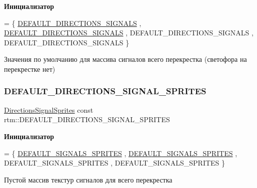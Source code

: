 {\bfseries Инициализатор}
\begin{DoxyCode}
= \{
        \hyperlink{namespacertm_ab5bb2d119539a5a60349a21fec8821f6}{DEFAULT\_DIRECTIONS\_SIGNALS}
        , \hyperlink{namespacertm_ab5bb2d119539a5a60349a21fec8821f6}{DEFAULT\_DIRECTIONS\_SIGNALS}
        , DEFAULT\_DIRECTIONS\_SIGNALS
        , DEFAULT\_DIRECTIONS\_SIGNALS
    \}
\end{DoxyCode}


Значения по умолчанию для массива сигналов всего перекрестка (светофора на перекрестке нет) 

\mbox{\label{namespacertm_a88c10d12831a4c6e13e0babdf7c27b02}} 
\subsubsection{\texorpdfstring{D\+E\+F\+A\+U\+L\+T\+\_\+\+D\+I\+R\+E\+C\+T\+I\+O\+N\+S\+\_\+\+S\+I\+G\+N\+A\+L\+\_\+\+S\+P\+R\+I\+T\+ES}{DEFAULT\_DIRECTIONS\_SIGNAL\_SPRITES}}
{\footnotesize\ttfamily \hyperlink{namespacertm_ac9f276c8ed33ee992eb1a1f04a8254a0}{Directions\+Signal\+Sprites} const rtm\+::\+D\+E\+F\+A\+U\+L\+T\+\_\+\+D\+I\+R\+E\+C\+T\+I\+O\+N\+S\+\_\+\+S\+I\+G\+N\+A\+L\+\_\+\+S\+P\+R\+I\+T\+ES}

{\bfseries Инициализатор}
\begin{DoxyCode}
= \{
        \hyperlink{namespacertm_a83e72513cb0cd2f63cff211387bdbb31}{DEFAULT\_SIGNALS\_SPRITES}
        , \hyperlink{namespacertm_a83e72513cb0cd2f63cff211387bdbb31}{DEFAULT\_SIGNALS\_SPRITES}
        , DEFAULT\_SIGNALS\_SPRITES
        , DEFAULT\_SIGNALS\_SPRITES
    \}
\end{DoxyCode}


Пустой массив текстур сигналов для всего перекрестка 

\mbox{\label{namespacertm_a9f4d245ca5d201a5853914c175d0d17f}} 
